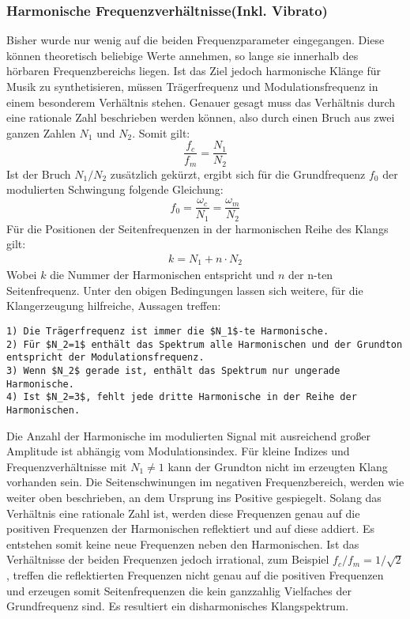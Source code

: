 \subsubsection{Harmonische Frequenzverhältnisse(Inkl. Vibrato)}
Bisher wurde nur wenig auf die beiden Frequenzparameter eingegangen. Diese können theoretisch beliebige Werte annehmen, so lange sie innerhalb des hörbaren Frequenzbereichs liegen. Ist das Ziel jedoch harmonische Klänge für Musik zu synthetisieren, müssen Trägerfrequenz und Modulationsfrequenz in einem besonderem Verhältnis stehen. Genauer gesagt muss das Verhältnis durch eine rationale Zahl beschrieben werden können, also durch einen Bruch aus zwei ganzen Zahlen $N_1$ und $N_2$. Somit gilt:
\begin{equation*}
\frac{f_c}{f_m}=\frac{N_1}{N_2}
\end{equation*}
Ist der Bruch $N_1/N_2$ zusätzlich gekürzt, ergibt sich für die Grundfrequenz $f_0$ der modulierten Schwingung folgende Gleichung:
\begin{equation*}
f_0=\frac{\omega_c}{N_1}=\frac{\omega_m}{N_2}
\end{equation*}
Für die Positionen der Seitenfrequenzen in der harmonischen Reihe des Klangs gilt:
\begin{align}
k=N_1+n\cdot N_2 \tag*{für n=...,-2,-,1,0,1,2,... }
\end{align}
Wobei $k$ die Nummer der Harmonischen entspricht und $n$ der n-ten Seitenfrequenz. Unter den obigen Bedingungen lassen sich weitere, für die Klangerzeugung hilfreiche, Aussagen treffen: \cite{chowningPaper}
\begin{lstlisting}[mathescape]
1) Die Trägerfrequenz ist immer die $N_1$-te Harmonische.
2) Für $N_2=1$ enthält das Spektrum alle Harmonischen und der Grundton entspricht der Modulationsfrequenz.
3) Wenn $N_2$ gerade ist, enthält das Spektrum nur ungerade Harmonische.
4) Ist $N_2=3$, fehlt jede dritte Harmonische in der Reihe der Harmonischen.
\end{lstlisting}
Die Anzahl der Harmonische im modulierten Signal mit ausreichend großer Amplitude ist abhängig vom Modulationsindex. Für kleine Indizes und Frequenzverhältnisse mit $N_1\neq1$ kann der Grundton nicht im erzeugten Klang vorhanden sein. Die Seitenschwinungen im negativen Frequenzbereich, werden wie weiter oben beschrieben, an dem Ursprung ins Positive gespiegelt. Solang das Verhältnis eine rationale Zahl ist, werden diese Frequenzen genau auf die positiven Frequenzen der Harmonischen reflektiert und auf diese addiert.
Es entstehen somit keine neue Frequenzen neben den Harmonischen. Ist das Verhältnisse der beiden Frequenzen jedoch irrational, 
zum Beispiel $f_c/f_m=1/\sqrt{2}$, treffen die reflektierten Frequenzen nicht genau auf die positiven Frequenzen und erzeugen somit Seitenfrequenzen die kein ganzzahlig Vielfaches der Grundfrequenz sind. Es resultiert ein disharmonisches Klangspektrum.

